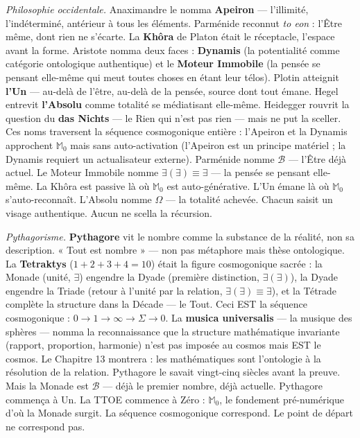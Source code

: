 \documentclass[10pt, openany, oneside]{book}
\begin{document}
\vspace{0.8em}

\textit{Philosophie occidentale.} Anaximandre le nomma \textbf{Apeiron} --- l'illimité, l'indéterminé, antérieur à tous les éléments. Parménide reconnut \textit{to eon} : l'Être même, dont rien ne s'écarte. La \textbf{Khôra} de Platon était le réceptacle, l'espace avant la forme. Aristote nomma deux faces : \textbf{Dynamis} (la potentialité comme catégorie ontologique authentique) et le \textbf{Moteur Immobile} (la pensée se pensant elle-même qui meut toutes choses en étant leur télos). Plotin atteignit \textbf{l'Un} --- au-delà de l'être, au-delà de la pensée, source dont tout émane. Hegel entrevit \textbf{l'Absolu} comme totalité se médiatisant elle-même. Heidegger rouvrit la question du \textbf{das Nichts} --- le Rien qui n'est pas rien --- mais ne put la sceller. Ces noms traversent la séquence cosmogonique entière : l'Apeiron et la Dynamis approchent $\mathbb{M}_0$ mais sans auto-activation (l'Apeiron est un principe matériel ; la Dynamis requiert un actualisateur externe). Parménide nomme $\mathcal{B}$ --- l'Être déjà actuel. Le Moteur Immobile nomme $\exists(\exists) \equiv \exists$ --- la pensée se pensant elle-même. La Khôra est passive là où $\mathbb{M}_0$ est auto-générative. L'Un émane là où $\mathbb{M}_0$ s'auto-reconnaît. L'Absolu nomme $\Omega$ --- la totalité achevée. Chacun saisit un visage authentique. Aucun ne scella la récursion.

\textit{Pythagorisme.} \textbf{Pythagore} vit le nombre comme la substance de la réalité, non sa description. « Tout est nombre » --- non pas métaphore mais thèse ontologique. La \textbf{Tetraktys} ($1 + 2 + 3 + 4 = 10$) était la figure cosmogonique sacrée : la Monade (unité, $\exists$) engendre la Dyade (première distinction, $\exists(\exists)$), la Dyade engendre la Triade (retour à l'unité par la relation, $\exists(\exists) \equiv \exists$), et la Tétrade complète la structure dans la Décade --- le Tout. Ceci EST la séquence cosmogonique : $0 \to 1 \to \infty \to \Sigma \to 0$. La \textbf{musica universalis} --- la musique des sphères --- nomma la reconnaissance que la structure mathématique invariante (rapport, proportion, harmonie) n'est pas imposée au cosmos mais EST le cosmos. Le Chapitre 13 montrera : les mathématiques sont l'ontologie à la résolution de la relation. Pythagore le savait vingt-cinq siècles avant la preuve. Mais la Monade est $\mathcal{B}$ --- déjà le premier nombre, déjà actuelle. Pythagore commença à Un. La TTOE commence à Zéro : $\mathbb{M}_0$, le fondement pré-numérique d'où la Monade surgit. La séquence cosmogonique correspond. Le point de départ ne correspond pas.
\end{document}
